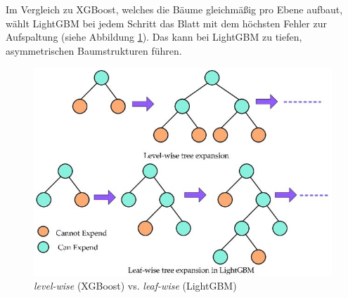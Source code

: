 Im Vergleich zu XGBoost, welches die Bäume gleichmäßig pro Ebene aufbaut, wählt LightGBM bei jedem Schritt das Blatt mit dem höchsten Fehler zur Aufspaltung
(siehe Abbildung \ref{fig:lightgbm_vs_xgboost}). Das kann bei LightGBM zu tiefen, asymmetrischen Baumstrukturen führen.

\begin{figure}[htbp]
    \begin{center}
        \includegraphics[scale=1.5]{static/lightgbm_vs_xgboost.jpg}
        \caption{\label{fig:lightgbm_vs_xgboost} \textit{level-wise} (XGBoost) vs. \textit{leaf-wise} (LightGBM) \cite{sheng2022}}
    \end{center}
\end{figure}


